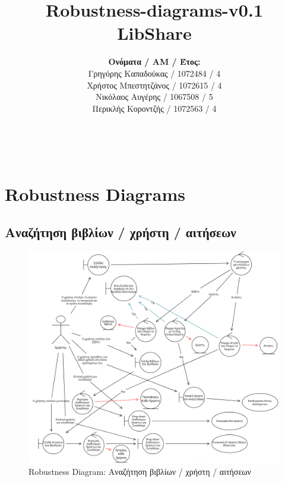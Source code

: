 \documentclass[12pt,a4paper]{article}
\title{Robustness-diagrams-v0.1 \\ LibShare}
\author{\textbf{Ονόματα / ΑΜ / Έτος:} \\ Γρηγόρης Καπαδούκας / 1072484 / 4\textdegree \\ Χρήστος Μπεστητζάνος / 1072615 / 4\textdegree \\ Νικόλαος Αυγέρης / 1067508 / 5\textdegree \\ Περικλής Κοροντζής / 1072563 / 4\textdegree}
\begin{document}
\makeatletter
\begin{center}
	\LARGE{\@title} \\
	\pagebreak
    \begin{LARGE}\@author\end{LARGE}
    \pagebreak
\end{center}

\section{Robustness Diagrams}

\subsection{Αναζήτηση βιβλίων / χρήστη / αιτήσεων}
\begin{figure}[H]
	\includegraphics[width=\textwidth]{Search Robustness.png}
	\caption{Robustness Diagram: Αναζήτηση βιβλίων / χρήστη / αιτήσεων}
	\label{Robustness Diagram: Αναζήτηση βιβλίων / χρήστη / αιτήσεων}
\end{figure}
\end{document}
